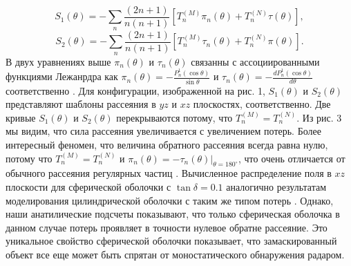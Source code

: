\documentclass[a4paper, 12pt]{article}
\begin{document}
\begin{equation*}
S_1(\theta)=-\sum_n{\frac{(2n+1)}{n(n+1)}[T_n^{(M)}\pi_n(\theta)+T_n^{(N)}\tau(\theta)]},
\end{equation*}
\begin{equation}\label{e17}
S_2(\theta)=-\sum_n{\frac{(2n+1)}{n(n+1)}[T_n^{(M)}\tau_n(\theta)+T_n^{(N)}\pi(\theta)]}.
\end{equation}
В двух уравнениях выше $\pi_n(\theta)$ и $\tau_n(\theta)$ связанны с
ассоциированными функциями Лежанрдра как 
$\pi_n(\theta)=-\frac{P_n^1(\cos\theta)}{\sin\theta}$ и 
$\tau_n(\theta)=-\frac{dP_n^1(\cos\theta)}{d\theta}$ соответственно \cite{15}.
Для конфигурации, изображенной на рис. 1, $S_1(\theta)$ и $S_2(\theta)$
представляют шаблоны рассеяния в $yz$ и $xz$ плоскостях, соответственно.
Две кривые $S_1(\theta)$ и $S_2(\theta)$ перекрываются потому, что 
$T_n^{(M)}=T_n^{(N)}$. Из рис. 3 мы видим, что сила рассеяния увеличивается
с увеличением потерь. Более интересный феномен, что величина обратного рассеяния
всегда равна нулю, потому что $T_n^{(M)}=T_n^{(N)}$ и $\pi_n(\theta)=-\tau_n(\theta
)|_{\theta=180^\circ}$, что очень отличается от обычного рассеяния регулярных 
частиц \cite{12}. Вычисленное распределение поля в $xz$ плоскости для сферической
оболочки с $\tan\delta=0.1$ аналогично результатам моделирования цилиндрической
оболочки с таким же типом потерь \cite{2}. Однако, наши анатилические подсчеты 
показывают, что только сферическая оболочка в данном случае потерь проявляет
в точности нулевое обратне рассеяние. Это уникальное свойство сферической оболочки
показывает, что замаскированный объект все еще может быть спрятан от 
моностатического обнаружения радаром.
\end{document}
